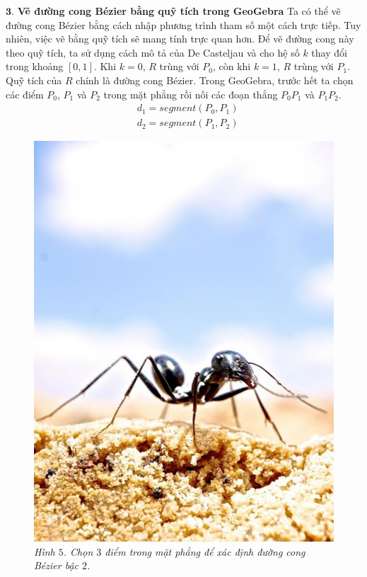 \begin{multicols}{2}
		\vskip 0.1cm
		$\pmb3.$ \textbf{\color{toanhocdoisong}Vẽ đường cong Bézier bằng quỹ tích trong GeoGebra}
		\vskip 0.1cm
		Ta có thể vẽ đường cong Bézier bằng cách nhập phương trình tham số một cách trực tiếp. Tuy nhiên, việc vẽ bằng quỹ tích sẽ mang tính trực quan hơn. Để vẽ đường cong này theo quỹ tích, ta sử dụng cách mô tả của De Casteljau và cho hệ số $k$ thay đổi trong khoảng $[0,1]$. Khi $k=0$, $R$ trùng với $P_0$, còn khi $k=1$, $R$ trùng với $P_1$. Quỹ tích của $R$ chính là đường cong Bézier.
		\vskip 0.1cm
		Trong GeoGebra, trước hết ta chọn các điểm $P_0$, $P_1$ và $P_2$ trong mặt phẳng rồi nối các đoạn thẳng $P_0 P_1$ và $P_1 P_2$.
		\begin{align*}
			&d_1= segment (P_0,P_1)\\
			&d_2= segment (P_1,P_2)
		\end{align*}
		\begin{figure}[H]
			\vspace*{-5pt}
			\centering
			\captionsetup{labelformat= empty, justification=centering}
			\includegraphics[width= 0.8\linewidth]{9}
			\caption{\small\textit{\color{toanhocdoisong}Hình $5$. Chọn $3$ điểm trong mặt phẳng để xác định đường cong Bézier bậc $2$.}}
			\vspace*{-10pt}
		\end{figure}

\end{multicols}
